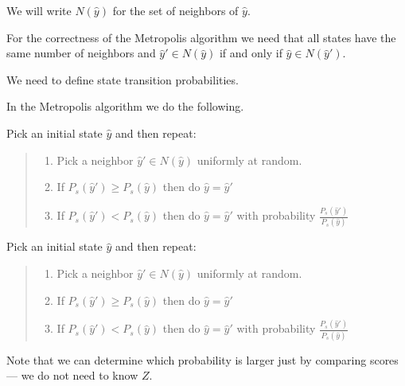 {\vfill
We will write $N(\hat{y})$ for the set of neighbors of $\hat{y}$.


\vfill
For the correctness of the Metropolis algorithm we need that all states have the same number of neighbors
and $\hat{y}' \in N(\hat{y})$ if and only if $\hat{y} \in N(\hat{y}')$.


We need to define state transition probabilities.

\vfill
In the {\color{red} Metropolis algorithm} we do the following.

\vfill
\vfill
Pick an initial state $\hat{y}$ and then repeat:
\vspace{-2ex}
\begin{quotation}
\noindent \begin{enumerate}
        \item Pick a neighbor $\hat{y}' \in N(\hat{y})$ uniformly at random.

        \vfill
        \item If $P_s(\hat{y}') \geq P_s(\hat{y})$ then do $\hat{y} = \hat{y}'$

  \vfill
\item If $P_s(\hat{y}') < P_s(\hat{y})$ then do $\hat{y} = \hat{y}'$ with probability $\frac{P_s(\hat{y}')}{P_s(\hat{y})}$
  \end{enumerate}  
\end{quotation}

Pick an initial state $\hat{y}$ and then repeat:
\vspace{-2ex}
\begin{quotation}
\noindent \begin{enumerate}
        \item Pick a neighbor $\hat{y}' \in N(\hat{y})$ uniformly at random.

        \vfill
        \item If $P_s(\hat{y}') \geq P_s(\hat{y})$ then do $\hat{y} = \hat{y}'$

  \vfill
\item If $P_s(\hat{y}') < P_s(\hat{y})$ then do $\hat{y} = \hat{y}'$ with probability $\frac{P_s(\hat{y}')}{P_s(\hat{y})}$
  \end{enumerate}  
\end{quotation}

\vfill
Note that we can determine which probability is larger just by comparing scores --- we do not need to know $Z$.

}
